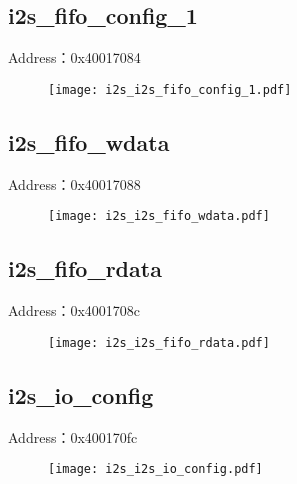 \subsection{i2s\_fifo\_config\_1}
\label{i2s-i2s-fifo-config-1}
Address：0x40017084
 \begin{figure}[H]
\texttt{[image: i2s\_i2s\_fifo\_config\_1.pdf]}
\end{figure}

\subsection{i2s\_fifo\_wdata}
\label{i2s-i2s-fifo-wdata}
Address：0x40017088
 \begin{figure}[H]
\texttt{[image: i2s\_i2s\_fifo\_wdata.pdf]}
\end{figure}

\subsection{i2s\_fifo\_rdata}
\label{i2s-i2s-fifo-rdata}
Address：0x4001708c
 \begin{figure}[H]
\texttt{[image: i2s\_i2s\_fifo\_rdata.pdf]}
\end{figure}

\subsection{i2s\_io\_config}
\label{i2s-i2s-io-config}
Address：0x400170fc
 \begin{figure}[H]
\texttt{[image: i2s\_i2s\_io\_config.pdf]}
\end{figure}

